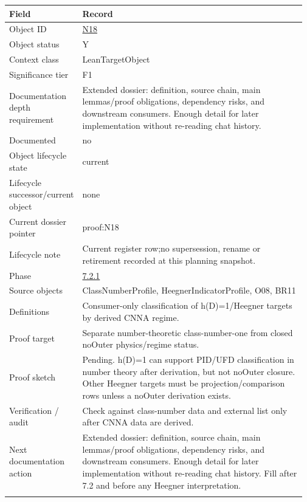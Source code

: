 \begin{longtable}{L{0.16\linewidth} L{0.81\linewidth}}
\hline
\textbf{Field} & \textbf{Record}\\
\hline
Object ID & \hyperlink{object-row-N18}{N18}\\
\hline\addlinespace[0.20em]
Object status & Y\\
\hline\addlinespace[0.20em]
Context class & LeanTargetObject\\
\hline\addlinespace[0.20em]
Significance tier & F1\\
\hline\addlinespace[0.20em]
Documentation depth requirement & Extended dossier: definition, source chain, main lemmas/\allowbreak{}proof obligations, dependency risks, and downstream consumers. Enough detail for later implementation without re-reading chat history.\\
\hline\addlinespace[0.20em]
Documented & no\\
\hline\addlinespace[0.20em]
Object lifecycle state & current\\
\hline\addlinespace[0.20em]
Lifecycle successor/\allowbreak{}current object & none\\
\hline\addlinespace[0.20em]
Current dossier pointer & proof:N18\\
\hline\addlinespace[0.20em]
Lifecycle note & Current register row;\newline no supersession, rename or retirement recorded at this planning snapshot.\\
\hline\addlinespace[0.20em]
Phase & \hyperlink{phase-row-7-2-1}{7.2.1}\\
\hline\addlinespace[0.20em]
Source objects & ClassNumberProfile, HeegnerIndicatorProfile, O08, BR11\\
\hline\addlinespace[0.20em]
Definitions & Consumer-only classification of h(D)=1/\allowbreak{}Heegner targets by derived CNNA regime.\\
\hline\addlinespace[0.20em]
Proof target & Separate number-theoretic class-number-one from closed noOuter physics/\allowbreak{}regime status.\\
\hline\addlinespace[0.20em]
Proof sketch & Pending. h(D)=1 can support PID/\allowbreak{}UFD classification in number theory after derivation, but not noOuter closure. Other Heegner targets must be projection/\allowbreak{}comparison rows unless a noOuter derivation exists.\\
\hline\addlinespace[0.20em]
Verification /\allowbreak{} audit & Check against class-number data and external list only after CNNA data are derived.\\
\hline\addlinespace[0.20em]
Next documentation action & Extended dossier: definition, source chain, main lemmas/\allowbreak{}proof obligations, dependency risks, and downstream consumers. Enough detail for later implementation without re-reading chat history. Fill after 7.2 and before any Heegner interpretation.\\
\hline\addlinespace[0.20em]
\end{longtable}
